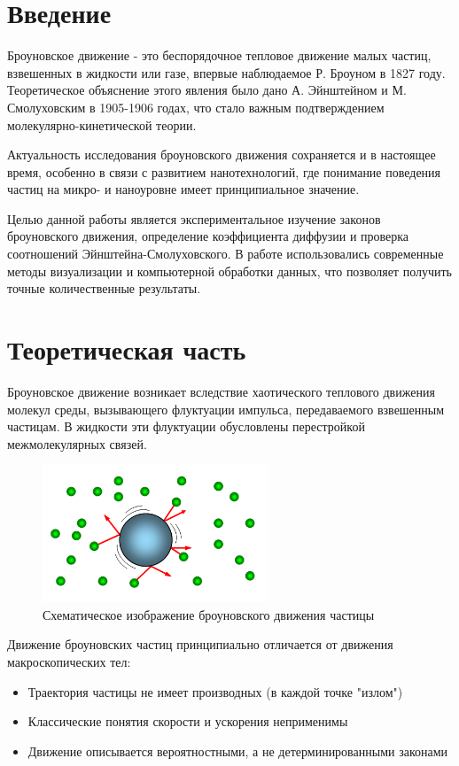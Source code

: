 \documentclass[a4paper,14pt]{article}
\begin{document}
\clearpage

\tableofcontents
\thispagestyle{empty}
\clearpage

\section{Введение}
Броуновское движение - это беспорядочное тепловое движение малых частиц, взвешенных в жидкости или газе, впервые наблюдаемое Р. Броуном в 1827 году. Теоретическое объяснение этого явления было дано А. Эйнштейном и М. Смолуховским в 1905-1906 годах, что стало важным подтверждением молекулярно-кинетической теории.

Актуальность исследования броуновского движения сохраняется и в настоящее время, особенно в связи с развитием нанотехнологий, где понимание поведения частиц на микро- и наноуровне имеет принципиальное значение.

Целью данной работы является экспериментальное изучение законов броуновского движения, определение коэффициента диффузии и проверка соотношений Эйнштейна-Смолуховского. В работе использовались современные методы визуализации и компьютерной обработки данных, что позволяет получить точные количественные результаты.

\section{Теоретическая часть}
Броуновское движение возникает вследствие хаотического теплового движения молекул среды, вызывающего флуктуации импульса, передаваемого взвешенным частицам. В жидкости эти флуктуации обусловлены перестройкой межмолекулярных связей.

\begin{figure}[h]
    \centering
    \includegraphics[width=0.6\textwidth]{brown.png}
    \caption{Схематическое изображение броуновского движения частицы}
    \label{fig:brown}
\end{figure}

Движение броуновских частиц принципиально отличается от движения макроскопических тел:
\begin{itemize}
    \item Траектория частицы не имеет производных (в каждой точке "излом")
    \item Классические понятия скорости и ускорения неприменимы
    \item Движение описывается вероятностными, а не детерминированными законами
\end{itemize}
\end{document}
